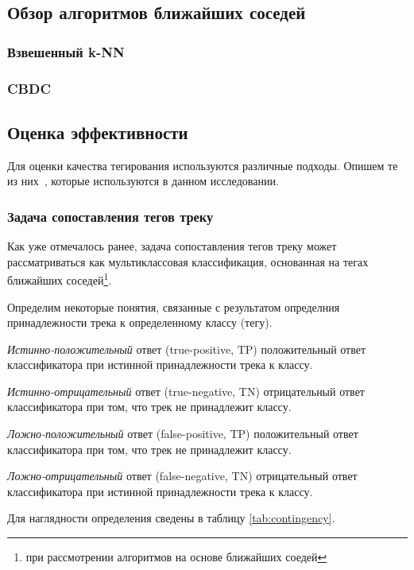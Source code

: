 \subsection{Обзор алгоритмов ближайших соседей}
\subsubsection{Взвешенный k-NN}
\subsubsection{CBDC}


\subsection{Оценка эффективности}

Для оценки качества тегирования используются различные подходы. Опишем те из них~\cite{msordo_thesis, prec_recall}, которые используются в данном исследовании.

\subsubsection{Задача сопоставления тегов треку}

Как уже отмечалось ранее, задача сопоставления тегов треку может рассматриваться как мультиклассовая классификация, 
основанная на тегах ближайших соседей\footnote{при рассмотрении алгоритмов на основе ближайших соедей}.

Определим некоторые понятия, связанные с результатом определния принадлежности трека к определенному классу (тегу).

\emph{Истинно-положительный} ответ (true-positive, TP) \ld положительный ответ классификатора при истинной принадлежности трека к классу.

\emph{Истинно-отрицательный} ответ (true-negative, TN) \ld отрицательный ответ классификатора при том, что трек не принадлежит классу.

\emph{Ложно-положительный} ответ (false-positive, TP) \ld положительный ответ классификатора при том, что трек не принадлежит классу.

\emph{Ложно-отрицательный} ответ (false-negative, TN) \ld отрицательный ответ классификатора при истинной принадлежности трека к классу.

Для наглядности определения сведены в таблицу \ref{tab:contingency}.

